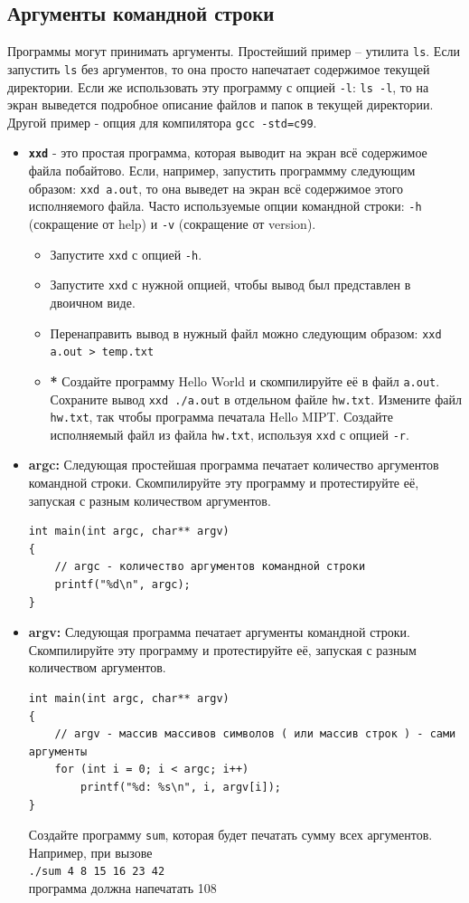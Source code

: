 \documentclass{article}
\begin{document}
\subsection*{Аргументы командной строки}
Программы могут принимать аргументы. Простейший пример -- утилита \texttt{ls}. Если запустить \texttt{ls} без аргументов, то она просто напечатает содержимое текущей директории.  Если же использовать эту программу с опцией \texttt{-l}: \texttt{ls -l}, то на экран выведется подробное описание файлов и папок в текущей директории. Другой пример - опция для компилятора \texttt{gcc -std=c99}.\\
\begin{itemize}

\item \textbf{\texttt{xxd}} - это простая программа, которая выводит на экран всё содержимое файла побайтово. Если, например, запустить программму следующим образом:
\texttt{xxd a.out}, то она выведет на экран всё содержимое этого исполняемого файла. Часто используемые опции командной строки: \texttt{-h} (сокращение от help) и \texttt{-v} (сокращение от version).
\begin{itemize}
\item Запустите \texttt{xxd} с опцией \texttt{-h}.
\item Запустите \texttt{xxd} с нужной опцией, чтобы вывод был представлен в двоичном виде.
\item Перенаправить вывод в нужный файл можно следующим образом:
\texttt{xxd a.out > temp.txt}
\item \textbf{*} Создайте программу Hello World и скомпилируйте её в файл \texttt{a.out}. Сохраните вывод \texttt{xxd ./a.out} в отдельном файле \texttt{hw.txt}. Измените файл \texttt{hw.txt}, так чтобы программа печатала Hello MIPT. Создайте исполняемый файл из файла \texttt{hw.txt}, используя \texttt{xxd} с опцией \texttt{-r}.
\end{itemize}

\item \textbf{argc:} Следующая простейшая программа печатает количество аргументов командной строки. Скомпилируйте эту программу и протестируйте её, запуская с разным количеством аргументов.
\begin{lstlisting}
int main(int argc, char** argv)
{
	// argc - количество аргументов командной строки
	printf("%d\n", argc);
}
\end{lstlisting}
\item \textbf{argv:} Следующая программа печатает аргументы командной строки. Скомпилируйте эту программу и протестируйте её, запуская с разным количеством аргументов.
\begin{lstlisting}
int main(int argc, char** argv)
{
	// argv - массив массивов символов ( или массив строк ) - сами аргументы
	for (int i = 0; i < argc; i++)
		printf("%d: %s\n", i, argv[i]);
}
\end{lstlisting}
Создайте программу \texttt{sum}, которая будет печатать сумму всех аргументов. Например, при вызове \\
\texttt{./sum 4 8 15 16 23 42}\\
программа должна напечатать 108


\end{itemize}
\end{document}
